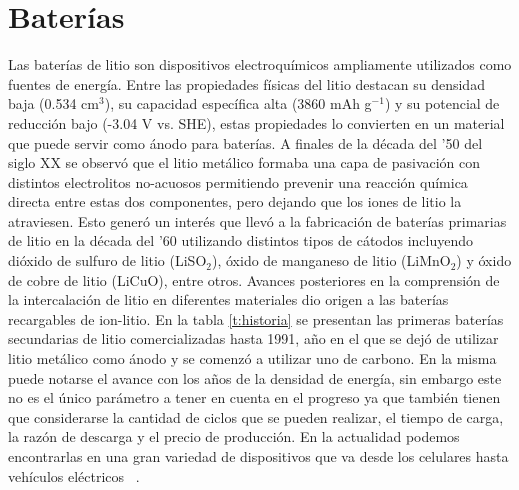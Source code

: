 \section{Baterías}

Las baterías de litio son dispositivos electroquímicos ampliamente utilizados 
como fuentes de energía. Entre las propiedades físicas del litio destacan su 
densidad baja (0.534 cm$^3$), su capacidad específica alta (3860 mAh g$^{-1}$) y
su potencial de reducción bajo (-3.04 V vs. SHE), estas propiedades lo convierten
en un material que puede servir como ánodo para baterías. A finales de la década
del '50 del siglo XX se observó que el litio metálico formaba una capa de 
pasivación con distintos electrolitos no-acuosos permitiendo prevenir una 
reacción química directa entre estas dos componentes, pero dejando que los iones 
de litio la atraviesen. Esto generó un interés que llevó a la fabricación de 
baterías primarias de litio en la década del '60 utilizando distintos tipos de 
cátodos incluyendo dióxido de sulfuro de litio (LiSO$_2$), óxido de manganeso de 
litio (LiMnO$_2$) y óxido de cobre de litio (LiCuO), entre otros. Avances 
posteriores en la comprensión de la intercalación de litio en diferentes 
materiales dio origen a las baterías recargables de ion-litio. En la tabla 
\ref{t:historia} se presentan las primeras baterías secundarias de litio 
comercializadas hasta 1991, año en el que se dejó de utilizar litio metálico como
ánodo y se comenzó a utilizar uno de carbono. En la misma puede notarse el avance 
con los años de la densidad de energía, sin embargo este no es el único parámetro 
a tener en cuenta en el progreso ya que también tienen que considerarse la 
cantidad de ciclos que se pueden realizar, el tiempo de carga, la razón de 
descarga y el precio de producción. En la actualidad podemos encontrarlas en una 
gran variedad de dispositivos que va desde los celulares hasta vehículos 
eléctricos ~\cite{reddy2020}. 
